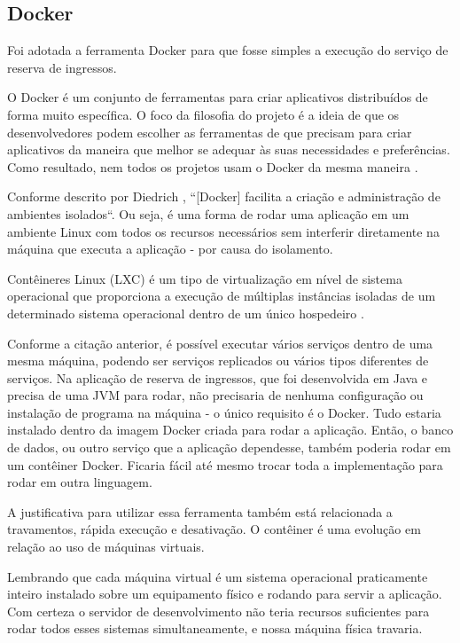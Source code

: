 \subsection{Docker}\label{docker}

Foi adotada a ferramenta Docker para que fosse simples a execução do serviço de reserva de ingressos.

\begin{citacao}
O Docker é um conjunto de ferramentas para criar aplicativos distribuídos de forma muito específica.
O foco da filosofia do projeto é a ideia de que os desenvolvedores podem escolher as ferramentas
de que precisam para criar aplicativos da maneira que melhor se adequar às suas necessidades e preferências.
Como resultado, nem todos os projetos usam o Docker da mesma maneira \cite{solomon-hykes}.
\end{citacao}

Conforme descrito por Diedrich \cite{mundodocker-o-que-e-docker}, ``[Docker] facilita a criação e administração de ambientes isolados``.
Ou seja, é uma forma de rodar uma aplicação em um ambiente Linux com todos os recursos necessários sem interferir
diretamente na máquina que executa a aplicação - por causa do isolamento.

\begin{citacao}
Contêineres Linux (LXC) é um tipo de
virtualização em nível de sistema operacional que proporciona a execução de múltiplas instâncias isoladas de um determinado
sistema operacional dentro de um único hospedeiro \cite{sinestec-01}.
\end{citacao}

Conforme a citação anterior, é possível executar vários serviços dentro de uma mesma máquina, podendo ser serviços
replicados ou vários tipos diferentes de serviços.
Na aplicação de reserva de ingressos, que foi desenvolvida em Java e precisa de uma JVM para rodar, não precisaria
de nenhuma configuração ou instalação de programa na máquina - o único requisito é o Docker.
Tudo estaria instalado dentro da imagem Docker criada para rodar a aplicação.
Então, o banco de dados, ou outro serviço que a aplicação dependesse, também poderia rodar em um contêiner Docker.
Ficaria fácil até mesmo trocar toda a implementação para rodar em outra linguagem.

A justificativa para utilizar essa ferramenta também está relacionada a travamentos, rápida execução e desativação.
O contêiner é uma evolução em relação ao uso de máquinas virtuais.

\begin{citacao}
Lembrando que cada máquina virtual é um sistema operacional praticamente inteiro instalado sobre um equipamento físico e
rodando para servir a aplicação. Com certeza o servidor de desenvolvimento não teria recursos suficientes para rodar
todos esses sistemas simultaneamente, e nossa máquina física travaria\cite{aprendendo-docker}.
\end{citacao}


